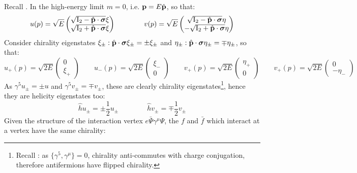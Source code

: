 Recall . In the high-energy limit $ m = 0 $, i.e. $ \mathbf{p} = E \hat{\mathbf{p}} $, so that:
\begin{equation*}
  u(p) = \sqrt{E}
  \begin{pmatrix}
    \sqrt{\mathrm{I}_2 - \hat{\mathbf{p}} \cdot \boldsymbol{\sigma}} \xi \\
    \sqrt{\mathrm{I}_2 + \hat{\mathbf{p}} \cdot \boldsymbol{\sigma}} \xi
  \end{pmatrix}
  \qquad \qquad
  v(p) = \sqrt{E}
  \begin{pmatrix}
    \sqrt{\mathrm{I}_2 - \hat{\mathbf{p}} \cdot \boldsymbol{\sigma}} \eta \\
    - \sqrt{\mathrm{I}_2 + \hat{\mathbf{p}} \cdot \boldsymbol{\sigma}} \eta
  \end{pmatrix}
\end{equation*}
Consider chirality eigenstates $ \xi_\pm : \hat{\mathbf{p}} \cdot \boldsymbol{\sigma} \xi_\pm = \pm \xi_\pm $ and $ \eta_\pm : \hat{\mathbf{p}} \cdot \boldsymbol{\sigma} \eta_\pm = \mp \eta_\pm $, so that:
\begin{equation*}
  u_+(p) = \sqrt{2E} \begin{pmatrix} 0 \\ \xi_+ \end{pmatrix}
  \qquad
  u_-(p) = \sqrt{2E} \begin{pmatrix} \xi_- \\ 0 \end{pmatrix}
  \qquad
  v_+(p) = \sqrt{2E} \begin{pmatrix} \eta_+ \\ 0 \end{pmatrix}
  \qquad
  v_+(p) = \sqrt{2E} \begin{pmatrix} 0 \\ -\eta_- \end{pmatrix}
\end{equation*}
As $ \gamma^5 u_\pm = \pm u $ and $ \gamma^5 v_\pm = \mp v_\pm $, these are clearly chirality eigenstates\footnote{Recall : as $ \{\gamma^5,\gamma^\mu\} = 0 $, chirality anti-commutes with charge conjugation, therefore antifermions have flipped chirality.}, hence they are helicity eigenstates too:
\begin{equation}
  \hat{h} u_\pm = \pm \frac{1}{2} u_\pm
  \qquad \qquad
  \hat{h} v_\pm = \mp \frac{1}{2} v_\pm
  \label{eq:spin-hel-massless}
\end{equation}
Given the structure of the interaction vertex $ e \bar{\Psi} \gamma^\mu \Psi $, the $ f $ and $ \bar{f} $ which interact at a vertex have the same chirality:
